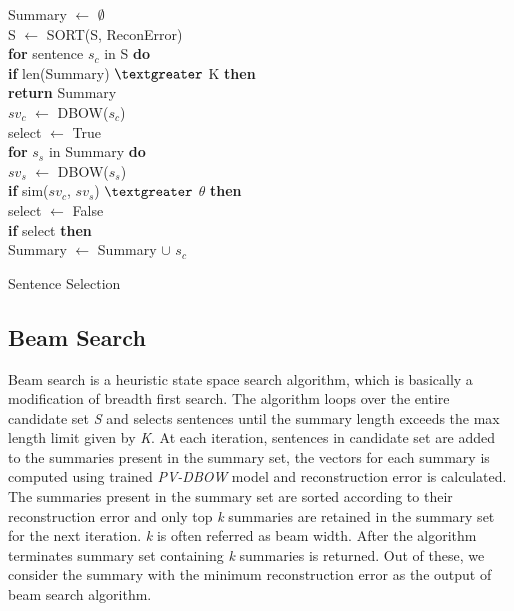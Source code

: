 \documentclass[11pt,a4paper]{article}
\begin{document}
\begin{algorithm}[h]
\hspace{3.5mm} Summary $\leftarrow$ $\emptyset$\\
\hspace{3.5mm} S $\leftarrow$ SORT(S, ReconError) \\
\hspace{3.5mm} {\bf for} sentence $s_c$ in S {\bf do}  \\
\hspace{9mm}   {\bf if} len(Summary) $\textgreater$ K {\bf then} \\
\hspace{14.5mm}  {\bf return} Summary \\
\hspace{9mm}   $sv_c$ $\leftarrow$ DBOW($s_c$) \\
\hspace{9mm}   select $\leftarrow$ True  \\
\hspace{9mm}   {\bf for} $s_s$ in Summary {\bf do} \\
\hspace{14.5mm}  $sv_s$ $\leftarrow$ DBOW($s_s$) \\
\hspace{14.5mm}  {\bf if} sim($sv_c$, $sv_s$) $\textgreater$ $\theta$ {\bf then} \\
\hspace{20mm}   select $\leftarrow$ False \\
\hspace{9mm} {\bf if} select {\bf then} \\
\hspace{14.5mm} Summary $\leftarrow$ Summary $\cup$ $s_c$

\caption{{ Sentence Selection} \label{Sentence Selection}}

\end{algorithm}

\subsection{Beam Search}

Beam search is a heuristic state space search algorithm, which is basically a modification of breadth first search. The algorithm loops over the entire candidate set \textit{S} and selects sentences until the summary length exceeds the max length limit given by \textit{K}.
At each iteration, sentences in candidate set are added to the summaries present in the summary set, the vectors for each summary is computed using trained \textit{PV-DBOW} model and reconstruction error is calculated. The summaries present in the summary set are sorted according to their reconstruction error and only top \textit{k} summaries are retained in the summary set for the next iteration. \textit{k} is often referred as beam width. After the algorithm terminates summary set containing \textit{k} summaries is returned. Out of these, we consider the summary with the minimum reconstruction error as the output of beam search algorithm.
\end{document}
